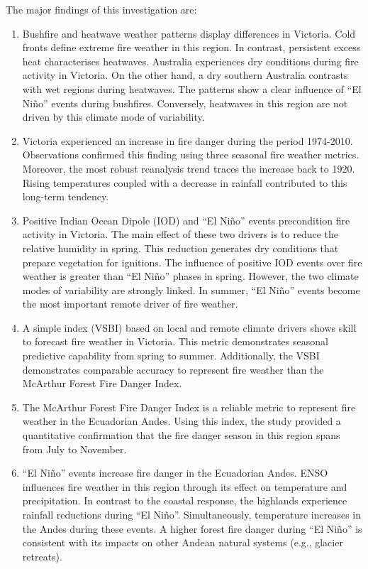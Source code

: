 The major findings of this investigation are:
\begin{enumerate}
\item Bushfire and heatwave weather patterns display differences in Victoria.
Cold fronts define extreme fire weather in this region. In contrast,
persistent excess heat characterises heatwaves. Australia experiences
dry conditions during fire activity in Victoria. On the other hand,
a dry southern Australia contrasts with wet regions during heatwaves.
The patterns show a clear influence of ``El Ni\~no'' events during
bushfires. Conversely, heatwaves in this region are not driven by
this climate mode of variability. 
\item Victoria experienced an increase in fire danger during the period
1974-2010. Observations confirmed this finding using three seasonal
fire weather metrics. Moreover, the most robust reanalysis trend traces
the increase back to 1920. Rising temperatures coupled with a decrease
in rainfall contributed to this long-term tendency.
\item Positive Indian Ocean Dipole (IOD) and ``El Ni\~no'' events precondition
fire activity in Victoria. The main effect of these two drivers is
to reduce the relative humidity in spring. This reduction generates
dry conditions that prepare vegetation for ignitions. The influence
of positive IOD events over fire weather is greater than ``El Ni\~no''
phases in spring. However, the two climate modes of variability are
strongly linked. In summer, ``El Ni\~no'' events become the most important
remote driver of fire weather.
\item A simple index (VSBI) based on local and remote climate drivers shows
skill to forecast fire weather in Victoria. This metric demonstrates
seasonal predictive capability from spring to summer. Additionally,
the VSBI demonstrates comparable accuracy to represent fire weather
than the McArthur Forest Fire Danger Index.
\item The McArthur Forest Fire Danger Index is a reliable metric to represent
fire weather in the Ecuadorian Andes. Using this index, the study
provided a quantitative confirmation that the fire danger season in
this region spans from July to November. 
\item ``El Ni\~no'' events increase fire danger in the Ecuadorian Andes.
ENSO influences fire weather in this region through its effect on
temperature and precipitation. In contrast to the coastal response,
the highlands experience rainfall reductions during ``El Ni\~no''.
Simultaneously, temperature increases in the Andes during these events.
A higher forest fire danger during ``El Ni\~no'' is consistent with
its impacts on other Andean natural systems (e.g., glacier retreats).
\end{enumerate}
